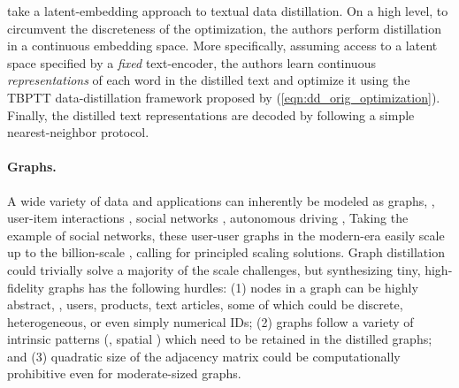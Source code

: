 \documentclass[10pt]{article} %
\begin{document}
\citet{text_distill} take a latent-embedding approach to textual data distillation. On a high level, to circumvent the discreteness of the optimization, the authors perform distillation in a continuous embedding space. More specifically, assuming access to a latent space specified by a \emph{fixed} text-encoder, the authors learn continuous \emph{representations} of each word in the distilled text and optimize it using the TBPTT data-distillation framework proposed by \citet{dd_orig} (\cref{eqn:dd_orig_optimization}). Finally, the distilled text representations are decoded by following a simple nearest-neighbor protocol.

\paragraph{Graphs.} A wide variety of data and applications can inherently be modeled as graphs, \eg, user-item interactions \citep{gnn_recsys_survey, eclare, reviews_sigir}, social networks \citep{gnn_social}, autonomous driving \citep{gnn_self_driving, gapformer}, \etc Taking the example of social networks, these user-user graphs in the modern-era easily scale up to the billion-scale \citep{graph_billion}, calling for principled scaling solutions. Graph distillation could trivially solve a majority of the scale challenges, but synthesizing tiny, high-fidelity graphs has the following hurdles: (1) nodes in a graph can be highly abstract, \eg, users, products, text articles, \etc some of which could be discrete, heterogeneous, or even simply numerical IDs; (2) graphs follow a variety of intrinsic patterns (\eg, spatial \citep{gcn}) which need to be retained in the distilled graphs; and (3) quadratic size of the adjacency matrix could be computationally prohibitive even for moderate-sized graphs.
\end{document}
